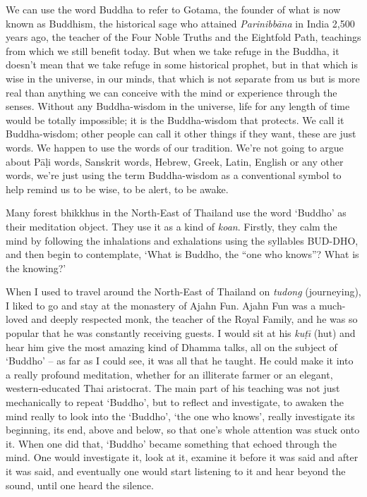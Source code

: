 We can use the word Buddha to refer to Gotama, the founder of what is now known as Buddhism, the historical sage who attained \textit{Parinibb\=ana} in India 2,500 years ago, the teacher of the Four Noble Truths and the Eightfold Path, teachings from which we still benefit today. But when we take refuge in the Buddha, it doesn't mean that we take refuge in some historical prophet, but in that which is wise in the universe, in our minds, that which is not separate from us but is more real than anything we can conceive with the mind or experience through the senses. Without any Buddha-wisdom in the universe, life for any length of time would be totally impossible; it is the Buddha-wisdom that protects. We call it Buddha-wisdom; other people can call it other things if they want, these are just words. We happen to use the words of our tradition. We're not going to argue about P\=a\d{l}i words, Sanskrit words, Hebrew, Greek, Latin, English or any other words, we're just using the term Buddha-wisdom as a conventional symbol to help remind us to be wise, to be alert, to be awake.

Many forest bhikkhus in the North-East of Thailand use the word `Buddho' as their meditation object. They use it as a kind of \textit{koan}. Firstly, they calm the mind by following the inhalations and exhalations using the syllables BUD-DHO, and then begin to contemplate, `What is Buddho, the ``one who knows''? What is the knowing?'

When I used to travel around the North-East of Thailand on \textit{tudong} (journeying), I liked to go and stay at the monastery of Ajahn Fun. Ajahn Fun was a much-loved and deeply respected monk, the teacher of the Royal Family, and he was so popular that he was constantly receiving guests. I would sit at his \textit{ku\d{t}\={\i}} (hut) and hear him give the most amazing kind of Dhamma talks, all on the subject of `Buddho' -- as far as I could see, it was all that he taught. He could make it into a really profound meditation, whether for an illiterate farmer or an elegant, western-educated Thai aristocrat. The main part of his teaching was  not just mechanically to repeat `Buddho', but to reflect and investigate, to awaken the mind really to look into the `Buddho', `the one who knows', really investigate its beginning, its end, above and below, so that one's whole attention was stuck onto it. When one did that, `Buddho' became something that echoed through the mind. One would investigate it, look at it, examine it before it was said and after it was said, and eventually one would start listening to it and hear beyond the sound, until one heard the silence.

